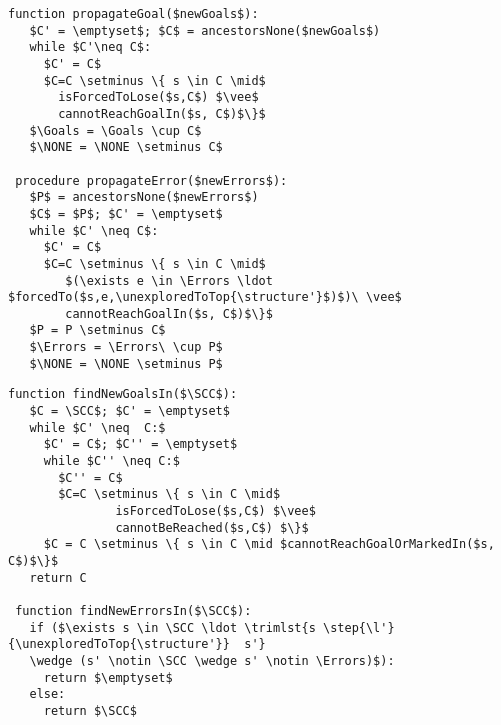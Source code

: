 \lstset{numbers=none, numberstyle=\tiny, stepnumber=1, numbersep=5pt}
\begin{lstlisting}[language={pseudocode},label={lst:dcs.propagate},caption={Status propagation procedures.},float=ht, frame=single]
 function propagateGoal($newGoals$):
   $C' = \emptyset$; $C$ = ancestorsNone($newGoals$)
   while $C'\neq C$:
     $C' = C$
     $C=C \setminus \{ s \in C \mid$ 
       isForcedToLose($s,C$) $\vee$
       cannotReachGoalIn($s, C$)$\}$
   $\Goals = \Goals \cup C$
   $\NONE = \NONE \setminus C$

 procedure propagateError($newErrors$):
   $P$ = ancestorsNone($newErrors$)
   $C$ = $P$; $C' = \emptyset$
   while $C' \neq C$:
     $C' = C$
     $C=C \setminus \{ s \in C \mid$ 
     	$(\exists e \in \Errors \ldot $forcedTo($s,e,\unexploredToTop{\structure'}$)$)\ \vee$
     	cannotReachGoalIn($s, C$)$\}$
   $P = P \setminus C$
   $\Errors = \Errors\ \cup P$
   $\NONE = \NONE \setminus P$
\end{lstlisting}


\begin{lstlisting}[language={pseudocode},label={lst:dcs.gather},caption={Status confirmation.},float=ht, frame=single]
 function findNewGoalsIn($\SCC$):
   $C = \SCC$; $C' = \emptyset$
   while $C' \neq  C:$
     $C' = C$; $C'' = \emptyset$
     while $C'' \neq C:$
       $C'' = C$
       $C=C \setminus \{ s \in C \mid$ 
               isForcedToLose($s,C$) $\vee$
               cannotBeReached($s,C$) $\}$
     $C = C \setminus \{ s \in C \mid $cannotReachGoalOrMarkedIn($s, C$)$\}$
   return C
  
 function findNewErrorsIn($\SCC$):
   if ($\exists s \in \SCC \ldot \trimlst{s \step{\l'}{\unexploredToTop{\structure'}}  s'} 
   \wedge (s' \notin \SCC \wedge s' \notin \Errors)$):
     return $\emptyset$
   else: 
     return $\SCC$
\end{lstlisting}





